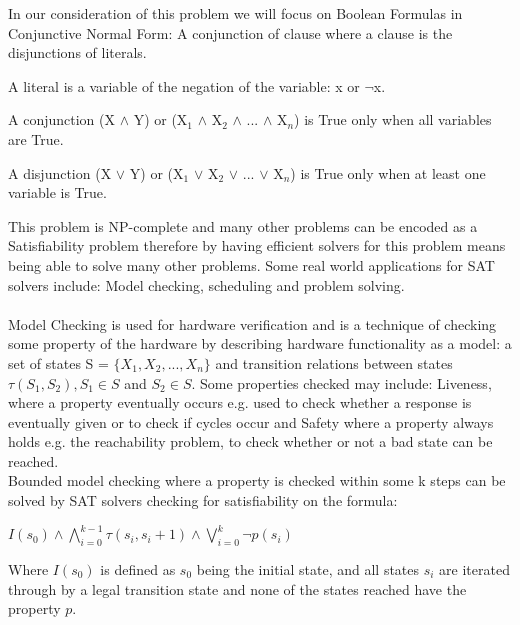 \documentclass[12pt,a4paper]{article}
\begin{document}
In our consideration of this problem we will focus on Boolean Formulas in Conjunctive Normal Form: A conjunction of clause where a clause is the disjunctions of literals. 
\begin{itemize}
	\begin{item}
	A literal is a variable of the negation of the variable: x or $\neg$x.
	\end{item}
	\begin{item}
	A conjunction (X $\land$ Y) or (X$_1$ $\land$ X$_2$ $\land$ ... $ \land$ X$_n$) is True only when all variables are True.
	\end{item}
	\begin{item}
	A disjunction (X $\lor$ Y) or (X$_1$ $\lor$ X$_2$ $\lor$ ... $\lor$ X$_n$) is True only when at least one variable is True.
	\end{item}
\end{itemize}
This problem is NP-complete and many other problems can be encoded as a Satisfiability problem therefore by having efficient solvers for this problem means being able to solve many other problems. Some real world applications for SAT solvers include: Model checking, scheduling and problem solving.\\\\
Model Checking is used for hardware verification and is a technique of checking some property of the hardware by describing hardware functionality as a model: a set of states S  = $\{X_1, X_2, ..., X_n\}$ and transition relations between states  $\tau(S_1, S_2), S_1\in S$ and $S_2 \in S$. Some properties checked may include: Liveness, where a property eventually occurs e.g. used to check whether a response is eventually given or to check if cycles occur and Safety where a property always holds e.g. the reachability problem, to check whether or not a bad state can be reached. \\
Bounded model checking where a property is checked within some k steps can be solved by SAT solvers checking for satisfiability on the formula: \\
\begin{center}
$I(s_0) \land \bigwedge \limits_{i=0}^{k-1} \tau(s_i, s_i+1) \land \bigvee \limits_{i=0}^{k}\neg p(s_i)$ 
\end{center}
Where $I(s_0)$ is defined as $s_0$ being the initial state, and all states $s_i$ are iterated through by a legal transition state and none of the states reached have the property $p$.\\\\ 
\newpage
\end{document}
